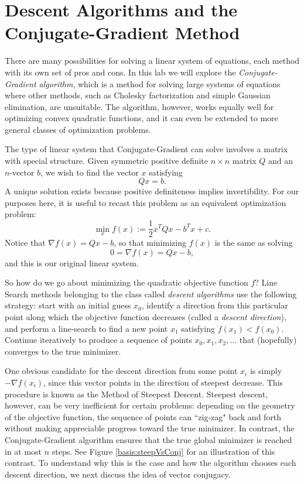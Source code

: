 
\section*{Descent Algorithms and the Conjugate-Gradient Method}
There are many possibilities for solving a linear system of equations, each method with its own set of pros and cons. In this lab we
will explore the \emph{Conjugate-Gradient algorithm}, which is a method for solving large systems of equations where other methods,
such as Cholesky factorization and simple Gaussian elimination, are unsuitable. The algorithm, however, works equally well for
optimizing convex quadratic functions, and it can even be extended to more general classes of optimization problems.

The type of linear system that Conjugate-Gradient can solve involves a matrix with special structure.
Given symmetric positive definite $n\times n$ matrix $Q$ and an $n$-vector $b$, we wish to find the vector $x$ satisfying
$$
Qx = b.
$$
A unique solution exists because positive definiteness implies invertibility.
For our purposes here, it is useful to recast this problem as an equivalent optimization problem:
$$
\min_{x} f(x) := \frac{1}{2}x^TQx - b^Tx + c.
$$
Notice that $\nabla f(x) = Qx - b$, so that minimizing $f(x)$ is the same as solving
$$
0 = \nabla f(x) = Qx - b,
$$
and this is our original linear system.

So how do we go about minimizing the quadratic objective function $f$? Line Search methods belonging to the class called
\emph{descent algorithms} use the following strategy: start with an initial guess $x_0$, identify a direction from
this particular point along which the objective function decreases (called a \emph{descent direction}), and perform a line-search to
find a new point $x_1$ satisfying $f(x_1) < f(x_0)$. Continue iteratively to produce a sequence of points $x_0, x_1, x_2, \ldots$
that (hopefully) converges to the true minimizer.

One obvious candidate for the descent direction from some point $x_i$ is simply
$-\nabla f(x_i)$, since this vector points in the direction of steepest decrease. This procedure is known as the Method of Steepest
Descent. Steepest descent, however, can be very inefficient for certain problems: depending on the geometry
of the objective function, the sequence of points can ``zig-zag" back and forth without making appreciable progress toward the true
minimizer. In contrast, the Conjugate-Gradient algorithm ensures that the true global minimizer is reached in at most $n$ steps. See
Figure \ref{basis:steepVsConj} for an illustration of this contrast.
To understand why this is the case and how the algorithm chooses each descent direction, we next discuss the idea of vector conjugacy.

